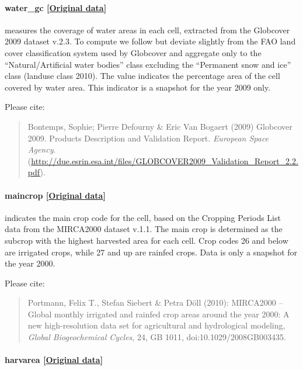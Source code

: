 \documentclass[]{book}
\begin{document}
\paragraph{water\_gc
{[}\href{http://due.esrin.esa.int/page_globcover.php}{Original
data}{]}}\label{water-gc}

measures the coverage of water areas in each cell, extracted from the
Globcover 2009 dataset v.2.3. To compute  we follow
but deviate slightly from the FAO land cover classification system used
by Globcover and aggregate only to the ``Natural/Artificial water
bodies'' class excluding the ``Permanent snow and ice'' class (landuse
class 2010). The value indicates the percentage area of the cell covered
by water area. This indicator is a snapshot for the year 2009 only.

Please cite:

\begin{quote}
Bontemps, Sophie; Pierre Defourny \& Eric Van Bogaert (2009) Globcover
2009. Products Description and Validation Report. \emph{European Space
Agency}.
(\url{http://due.esrin.esa.int/files/GLOBCOVER2009_Validation_Report_2.2.pdf}).
\end{quote}

\paragraph{maincrop
{[}\href{http://www.uni-frankfurt.de/45218031}{Original
data}{]}}\label{maincrop}

indicates the main crop code for the cell, based on the Cropping Periods
List data from the MIRCA2000 dataset v.1.1. The main crop is determined
as the subcrop with the highest harvested area for each cell. Crop codes 26
and below are irrigated crops, while 27 and up are rainfed crops. Data
is only a snapshot for the year 2000.

Please cite:

\begin{quote}
Portmann, Felix T., Stefan Siebert \& Petra Döll (2010): MIRCA2000 --
Global monthly irrigated and rainfed crop areas around the year 2000: A
new high-resolution data set for agricultural and hydrological modeling,
\emph{Global Biogeochemical Cycles}, 24, GB 1011,
doi:10.1029/2008GB003435.
\end{quote}

\paragraph{harvarea
{[}\href{http://www.uni-frankfurt.de/45218031}{Original
data}{]}}\label{harvarea}
\end{document}
